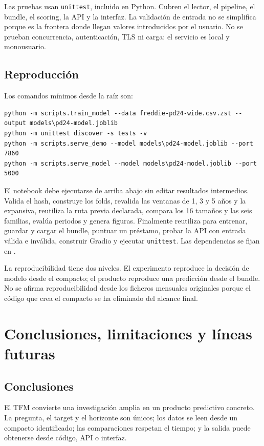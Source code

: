 \documentclass[10pt,a4paper]{article}
\begin{document}
Las pruebas usan \texttt{unittest}, incluido en Python. Cubren el lector, el
pipeline, el bundle, el scoring, la API y la interfaz. La validación de entrada
no se simplifica porque es la frontera donde llegan valores introducidos por el
usuario. No se prueban concurrencia, autenticación, TLS ni carga: el servicio es
local y monousuario.

\subsection{Reproducción}

Los comandos mínimos desde la raíz son:

{\scriptsize
\begin{verbatim}
python -m scripts.train_model --data freddie-pd24-wide.csv.zst --output models\pd24-model.joblib
python -m unittest discover -s tests -v
python -m scripts.serve_demo --model models\pd24-model.joblib --port 7860
python -m scripts.serve_model --model models\pd24-model.joblib --port 5000
\end{verbatim}}

El notebook  debe ejecutarse de arriba
abajo sin editar resultados intermedios. Valida el hash, construye los folds,
revalida las ventanas de 1, 3 y 5 años y la expansiva, reutiliza la ruta previa
declarada, compara los 16 tamaños y las seis familias, evalúa periodos y genera
figuras. Finalmente reutiliza  para entrenar, guardar y cargar el
bundle, puntuar un préstamo, probar la API con entrada válida e inválida,
construir Gradio y ejecutar \texttt{unittest}. Las dependencias se fijan en
.

La reproducibilidad tiene dos niveles. El experimento reproduce la decisión de
modelo desde el compacto; el producto reproduce una predicción desde el bundle.
No se afirma reproducibilidad desde los ficheros mensuales originales porque el
código que crea el compacto se ha eliminado del alcance final.

\clearpage
\section{Conclusiones, limitaciones y líneas futuras}

\subsection{Conclusiones}

El TFM convierte una investigación amplia en un producto predictivo concreto.
La pregunta, el target y el horizonte son únicos; los datos se leen desde un
compacto identificado; las comparaciones respetan el tiempo; y la salida puede
obtenerse desde código, API o interfaz.
\end{document}
